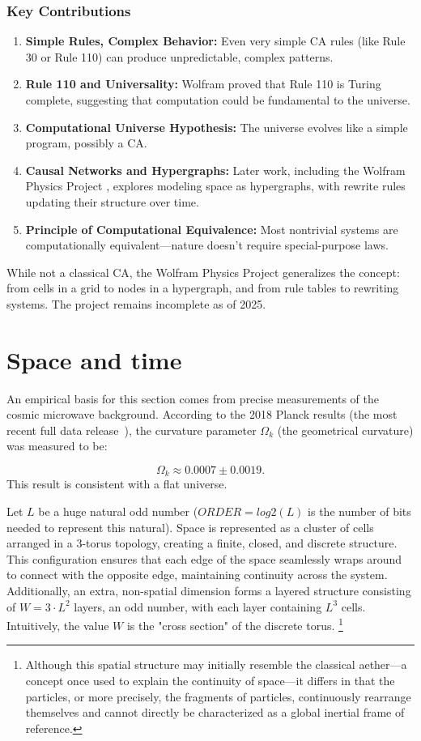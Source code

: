 \documentclass[12pt,english]{article}
\begin{document}
\subsubsection*{Key Contributions}
\begin{enumerate}
  \item \textbf{Simple Rules, Complex Behavior:} Even very simple CA rules (like Rule 30 or Rule 110) can produce unpredictable, complex patterns.
  \item \textbf{Rule 110 and Universality:} Wolfram proved that Rule 110 is Turing complete, suggesting that computation could be fundamental to the universe.
  \item \textbf{Computational Universe Hypothesis:} The universe evolves like a simple program, possibly a CA.
  \item \textbf{Causal Networks and Hypergraphs:} Later work, including the Wolfram Physics Project \cite{wolfram2020physics}, explores modeling space as hypergraphs, with rewrite rules updating their structure over time.
  \item \textbf{Principle of Computational Equivalence:} Most nontrivial systems are computationally equivalent—nature doesn't require special-purpose laws.
\end{enumerate}

While not a classical CA, the Wolfram Physics Project generalizes the concept: from cells in a grid to nodes in a hypergraph, and from rule tables to rewriting systems. The project remains incomplete as of 2025.

\section{Space and time \label{sec:space-and-time}}

An empirical basis for this section comes from precise measurements of the cosmic microwave background. According to the 2018 Planck results (the most recent full data release~\cite{Planck2018Parameters}), the curvature parameter $\Omega_k$ (the geometrical curvature) was measured to be:

\[
\Omega_k \approx 0.0007 \pm 0.0019.
\]
This result is consistent with a flat universe.

Let \ensuremath{L} be a huge natural odd number ($ORDER=log2(L)$ is the number of bits needed to represent this natural). Space is represented as a cluster of cells arranged in a 3-torus topology, creating a finite, closed, and discrete structure. This configuration ensures that each edge of the space seamlessly wraps around to connect with the opposite edge, maintaining continuity across the system. Additionally, an extra, non-spatial dimension forms a layered structure consisting of $W=3\cdot L^2$ layers, an odd number, with each layer containing $L^{3}$ cells. Intuitively, the value $W$ is the "cross section" of the discrete torus. \footnote{Although this spatial structure may initially resemble the classical aether—a concept once used to explain the continuity of space—it differs in that the particles, or more precisely, the fragments of particles, continuously rearrange themselves and cannot directly be characterized as a global inertial frame of reference.}
\end{document}

